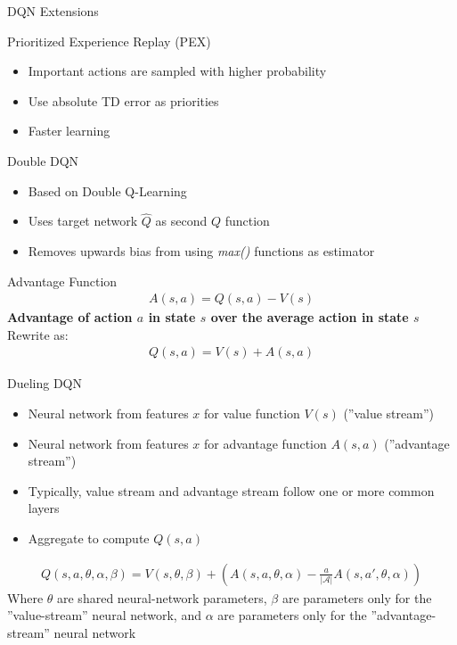 \documentclass[ignorenonframetext,xcolor=x11names]{beamer}
\begin{document}
\begin{frame}[label=full]{DQN Extensions}
\begin{block}{Prioritized Experience Replay (PEX)}
\begin{itemize}
   \item Important actions are sampled with higher probability
   \item Use absolute TD error as priorities
   \item Faster learning
\end{itemize}
\end{block}

\begin{block}{Double DQN}
\begin{itemize}
   \item Based on Double Q-Learning
   \item Uses target network $\hat{Q}$ as second $Q$ function
   \item Removes upwards bias from using \emph{max()} functions as estimator
\end{itemize}
\end{block}
\end{frame}

\begin{frame}[label=full]{Advantage Function}
\begin{align*}
A(s, a) = Q(s, a) - V(s)
\end{align*}
\textbf{Advantage of action $a$ in state $s$ over the average action in state $s$} \\

Rewrite as:
\begin{align*}
Q(s, a) = V(s) + A(s, a)
\end{align*}
\end{frame}

\begin{frame}[label=full]{Dueling DQN}
\begin{itemize}
   \item Neural network from features $x$ for value function $V(s)$ (''value stream'')
   \item Neural network from features $x$ for advantage function $A(s, a)$ (''advantage stream'')
   \item Typically, value stream and advantage stream follow one or more common layers
   \item Aggregate to compute $Q(s, a)$
\end{itemize}
\begin{align*}
Q(s, a, \theta, \alpha, \beta) = V(s, \theta, \beta) + \left( A(s, a, \theta, \alpha) - \frac{a}{|\mathcal{A}|} A(s, a', \theta, \alpha) \right)
\end{align*}
Where $\theta$ are shared neural-network parameters, $\beta$ are parameters only for the ''value-stream'' neural network, and $\alpha$ are parameters only for the ''advantage-stream'' neural network
\end{frame}
\end{document}
